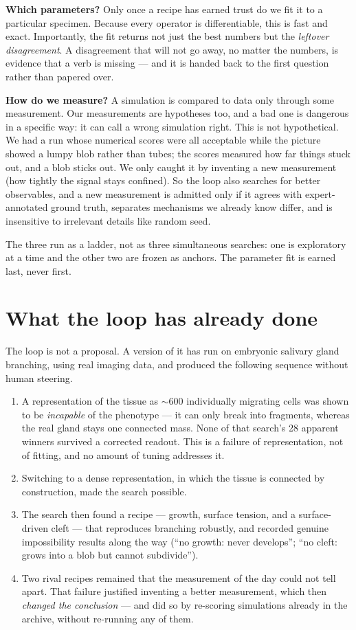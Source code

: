 \documentclass[11pt]{article}
\begin{document}
\textbf{Which parameters?} Only once a recipe has earned trust do we fit it to a particular
specimen. Because every operator is differentiable, this is fast and exact. Importantly, the fit
returns not just the best numbers but the \emph{leftover disagreement}. A disagreement that will
not go away, no matter the numbers, is evidence that a verb is missing --- and it is handed back
to the first question rather than papered over.

\textbf{How do we measure?} A simulation is compared to data only through some measurement. Our
measurements are hypotheses too, and a bad one is dangerous in a specific way: it can call a
wrong simulation right. This is not hypothetical. We had a run whose numerical scores were all
acceptable while the picture showed a lumpy blob rather than tubes; the scores measured how far
things stuck out, and a blob sticks out. We only caught it by inventing a new measurement (how
tightly the signal stays confined). So the loop also searches for better observables, and a new
measurement is admitted only if it agrees with expert-annotated ground truth, separates
mechanisms we already know differ, and is insensitive to irrelevant details like random seed.

The three run as a ladder, not as three simultaneous searches: one is exploratory at a time and
the other two are frozen as anchors. The parameter fit is earned last, never first.

\section{What the loop has already done}

The loop is not a proposal. A version of it has run on embryonic salivary gland branching, using
real imaging data, and produced the following sequence without human steering.

\begin{enumerate}\itemsep2pt
\item A representation of the tissue as $\sim$600 individually migrating cells was shown to be
\emph{incapable} of the phenotype --- it can only break into fragments, whereas the real gland
stays one connected mass. None of that search's 28 apparent winners survived a corrected
readout. This is a failure of representation, not of fitting, and no amount of tuning addresses it.
\item Switching to a dense representation, in which the tissue is connected by construction, made
the search possible.
\item The search then found a recipe --- growth, surface tension, and a surface-driven cleft ---
that reproduces branching robustly, and recorded genuine impossibility results along the way
(``no growth: never develops''; ``no cleft: grows into a blob but cannot subdivide'').
\item Two rival recipes remained that the measurement of the day could not tell apart. That
failure justified inventing a better measurement, which then \emph{changed the conclusion} ---
and did so by re-scoring simulations already in the archive, without re-running any of them.
\end{enumerate}
\end{document}
